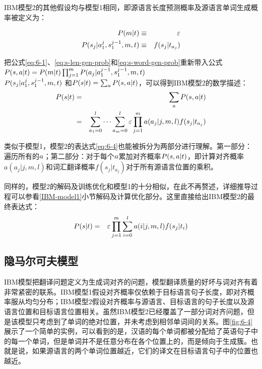 \parinterval IBM模型2的其他假设均与模型1相同，即源语言长度预测概率及源语言单词生成概率被定义为：

\begin{eqnarray}
{P}(m|{t}) & \equiv & \varepsilon \label{eq:s-len-gen-prob} \\
{P}(s_j|a_1^{j},s_1^{j-1},m,{t}) & \equiv & f(s_j|t_{a_j})
\label{eq:s-word-gen-prob}
\end{eqnarray}

把公式\eqref{eq:6-1}、\eqref{eq:s-len-gen-prob}和\eqref{eq:s-word-gen-prob}重新带入公式${P}({s},{a}|{t})={P}(m|{t})\prod_{j=1}^{m}{{P}(a_j|a_1^{j-1},s_1^{j-1},m,{t})}$\\${{P}(s_j|a_1^{j},s_1^{j-1},m,{t})}$ 和${P}({s}|{t})= \sum_{{a}}{P}({s},{a}|{t})$，可以得到IBM模型2的数学描述：
\begin{eqnarray}
{P}({s}| {t}) & = &  \sum_{{a}}{{P}({s},{a}| {t})} \nonumber \\
                       & = & \sum_{a_1=0}^{l}{\cdots}\sum _{a_m=0}^{l}{\varepsilon}\prod_{j=1}^{m}{a(a_j|j,m,l)f(s_j|t_{a_j})}
\label{eq:6-4}
\end{eqnarray}

\parinterval 类似于模型1，模型2的表达式\eqref{eq:6-4}也能被拆分为两部分进行理解。第一部分：遍历所有的${a}$；第二部分：对于每个${a}$累加对齐概率${P}({s},{a}| {t})$，即计算对齐概率$a(a_j|j,m,l)$和词汇翻译概率$f(s_j|t_{a_j})$对于所有源语言位置的乘积。

\parinterval 同样的，模型2的解码及训练优化和模型1的十分相似，在此不再赘述，详细推导过程可以参看{\chapterfive}\ref{IBM-model1}小节解码及计算优化部分。这里直接给出IBM模型2的最终表达式：
\begin{eqnarray}
{P}({s}| {t}) & = & \varepsilon \prod\limits_{j=1}^{m} \sum\limits_{i=0}^{l} a(i|j,m,l) f(s_j|t_i)
\label{eq:6-5}
\end{eqnarray}



\subsection{隐马尔可夫模型}

\parinterval IBM模型把翻译问题定义为生成词对齐的问题，模型翻译质量的好坏与词对齐有着非常紧密的联系。IBM模型1假设对齐概率仅依赖于目标语言句子长度，即对齐概率服从均匀分布；IBM模型2假设对齐概率与源语言、目标语言的句子长度以及源语言位置和目标语言位置相关。虽然IBM模型2已经覆盖了一部分词对齐问题，但是该模型只考虑到了单词的绝对位置，并未考虑到相邻单词间的关系。图\ref{fig:6-4} 展示了一个简单的实例，可以看到的是，汉语的每个单词都被分配给了英语句子中的每一个单词，但是单词并不是任意分布在各个位置上的，而是倾向于生成簇。也就是说，如果源语言的两个单词位置越近，它们的译文在目标语言句子中的位置也越近。

